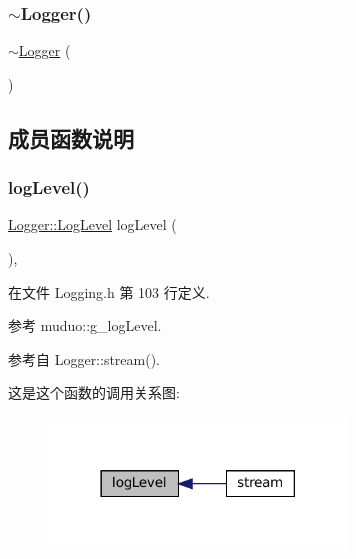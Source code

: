 \mbox{\label{classmuduo_1_1Logger_a0d77f27eb95c246d555904aaf08018eb}} 
\subsubsection{\texorpdfstring{$\sim$\+Logger()}{~Logger()}}
{\footnotesize\ttfamily $\sim$\hyperlink{classmuduo_1_1Logger}{Logger} (\begin{DoxyParamCaption}{ }\end{DoxyParamCaption})}



\subsection{成员函数说明}
\mbox{\label{classmuduo_1_1Logger_a0cf9854e69e225406d284d66ebaf9dfe}} 
\subsubsection{\texorpdfstring{log\+Level()}{logLevel()}}
{\footnotesize\ttfamily \hyperlink{classmuduo_1_1Logger_aca1fd1d8935433e6ba2e3918214e07f9}{Logger\+::\+Log\+Level} log\+Level (\begin{DoxyParamCaption}{ }\end{DoxyParamCaption})\hspace{0.3cm}{\ttfamily [inline]}, {\ttfamily [static]}}



在文件 Logging.\+h 第 103 行定义.



参考 muduo\+::g\+\_\+log\+Level.



参考自 Logger\+::stream().

这是这个函数的调用关系图\+:
\nopagebreak
\begin{figure}[H]
\begin{center}
\leavevmode
\includegraphics[width=225pt]{classmuduo_1_1Logger_a0cf9854e69e225406d284d66ebaf9dfe_icgraph}
\end{center}
\end{figure}
\mbox{\label{classmuduo_1_1Logger_af1e4b6b611cd983fa68ec4038d45b621}} 
